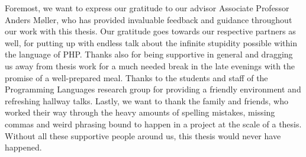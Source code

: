 Foremost, we want to express our gratitude to our advisor Associate Professor Anders Møller, who has provided invaluable feedback and guidance throughout our work with this thesis. Our gratitude goes towards our respective partners as well, for putting up with endless talk about the infinite stupidity possible within the language of PHP. Thanks also for being supportive in general and dragging us away from thesis work for a much needed break in the late evenings with the promise of a well-prepared meal. Thanks to the students and staff of the Programming Languages research group for providing a friendly environment and refreshing hallway talks. Lastly, we want to thank the family and friends, who worked their way through the heavy amounts of spelling mistakes, missing commas and weird phrasing bound to happen in a project at the scale of a thesis. Without all these supportive people around us, this thesis would never have happened.